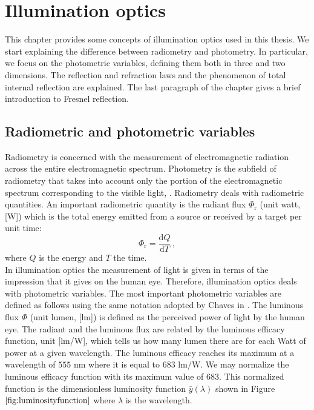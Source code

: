\chapter{Illumination optics}
This chapter provides some concepts of illumination optics used in this thesis. We start explaining the difference between radiometry and photometry.
In particular, we focus on the photometric variables, defining them both in three and two dimensions. The reflection and refraction laws and the phenomenon of total internal reflection are explained. The last paragraph of the chapter gives a brief introduction to Fresnel reflection. 
\section{Radiometric and photometric variables}\label{sec:photometry}
Radiometry is concerned with the measurement of electromagnetic radiation across the entire electromagnetic spectrum. Photometry is the subfield of radiometry that takes into account only the portion of the electromagnetic spectrum corresponding to the visible light, \cite{zalewski1995radiometry}. Radiometry deals with radiometric quantities. An important radiometric quantity  is the radiant flux $\Phi_{\textrm{r}}$ (unit watt, [\textrm{W}]) which is the total energy emitted from a source or received by a target per unit time:
\begin{equation}
\Phi_{\textrm{r}} = \frac{\textrm{d}Q}{\textrm{d}T}\,,
\end{equation}
where $Q$ is the energy and $T$ the time.\\
\indent In illumination optics the measurement of light is given in terms of the impression that it gives on the human eye. Therefore, illumination optics deals with photometric variables. The most important photometric variables are defined as follows using the same notation adopted by Chaves in \cite{chaves2015introduction}. The luminous flux $\Phi$ (unit lumen, [\textrm{lm}]) is defined as the perceived power of light by the human eye.
 The radiant and the luminous flux are related by the luminous efficacy function, unit [\textrm{lm}/\textrm{W}], which tells us how many lumen there are for each Watt of power at a given wavelength.
 The luminous efficacy reaches its maximum  at a wavelength of $555$ $\textrm{nm}$ where it is equal to $683$ $\textrm{lm}/\textrm{W}$.
  We may normalize the luminous efficacy function with its maximum value of $683$.
  This normalized function is the dimensionless luminosity function $\bar{y}(\lambda)$ shown in Figure $\ref{fig:luminosityfunction}$ where $\lambda$ is the wavelength.
